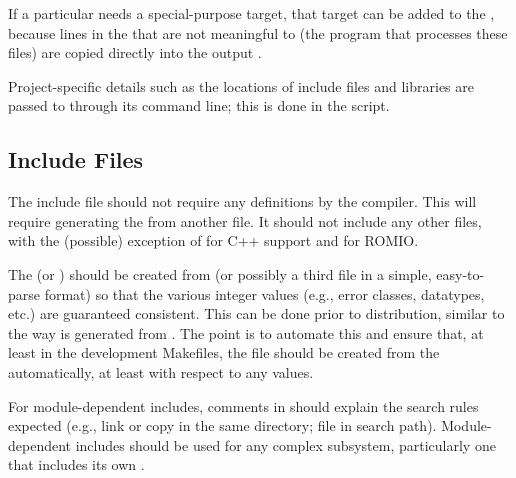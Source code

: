 \documentclass{article}
\begin{document}
If a particular  needs a special-purpose target, that target
can be added to the , because lines in the
 that are not meaningful to  (the
program that processes these 
files) are copied directly into the output .  

Project-specific details such as the locations of include files and libraries
are passed to  through its command line; this is done in the
 script.

\subsection{Include Files}
The include file  should not require any 
definitions by the compiler.  This will require generating the
 from another file.
It should not include any other
files, with the (possible) exception of  for C++
support and  for ROMIO.

The  (or ) should be created from
 (or possibly a third file in a simple, easy-to-parse
format) so that the various integer values (e.g., error classes, 
datatypes, etc.) are guaranteed consistent.  This can be done prior to
distribution, similar to the way  is generated from
.  The point is to automate this and ensure that,
at least in the development Makefiles, the  file
should be created from the  automatically, at least with
respect to any values. 



For module-dependent includes, comments in  should explain the
search rules expected (e.g., link or copy in the same directory; file in
search path).  Module-dependent includes should be used for any complex
subsystem, particularly one that includes its own .
\end{document}

